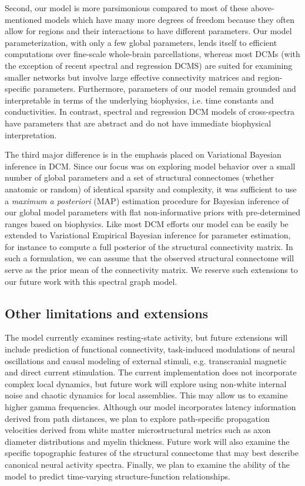 Second, our model is more parsimonious compared to most of these
above-mentioned models which have many more degrees of freedom because
they often allow for regions and their interactions to have different
parameters. Our model parameterization, with only a few global
parameters, lends itself to efficient computations over fine-scale
whole-brain parcellations, whereas most DCMs (with the exception of
recent spectral and regression DCMS\cite{razi_large-scale_2017,frassle_regression_2017,frassle_generative_2018}) are suited
for examining smaller networks but involve large effective connectivity
matrices and region-specific parameters. Furthermore, parameters of our
model remain grounded and interpretable in terms of the underlying
biophysics, i.e. time constants and conductivities. In contrast,
spectral and regression DCM models of cross-spectra have parameters that
are abstract and do not have immediate biophysical interpretation.

The third major difference is in the emphasis placed on Variational
Bayesian inference in DCM. Since our focus was on exploring model
behavior over a small number of global parameters and a set of
structural connectomes (whether anatomic or random) of identical
sparsity and complexity, it was sufficient to use a \emph{maximum a
posteriori} (MAP) estimation procedure for Bayesian inference of our
global model parameters with flat non-informative priors with
pre-determined ranges based on biophysics. Like most DCM efforts our
model can be easily be extended to Variational Empirical Bayesian
inference for parameter estimation, for instance to compute a full
posterior of the structural connectivity matrix. In such a formulation,
we can assume that the observed structural connectome will serve as the
prior mean of the connectivity matrix. We reserve such extensions to our
future work with this spectral graph model.

\subsection{Other limitations and extensions}

The model currently examines resting-state activity, but future
extensions will include prediction of functional connectivity,
task-induced modulations of neural oscillations and causal modeling of
external stimuli, e.g. transcranial magnetic and direct current
stimulation. The current implementation does not incorporate complex
local dynamics, but future work will explore using non-white internal
noise and chaotic dynamics for local assemblies. This may allow us to
examine higher gamma frequencies. Although our model incorporates
latency information derived from path distances, we plan to explore
path-specific propagation velocities derived from white matter
microstructural metrics such as axon diameter distributions and myelin
thickness. Future work will also examine the specific topographic
features of the structural connectome that may best describe canonical
neural activity spectra. Finally, we plan to examine the ability of the
model to predict time-varying structure-function relationships.

